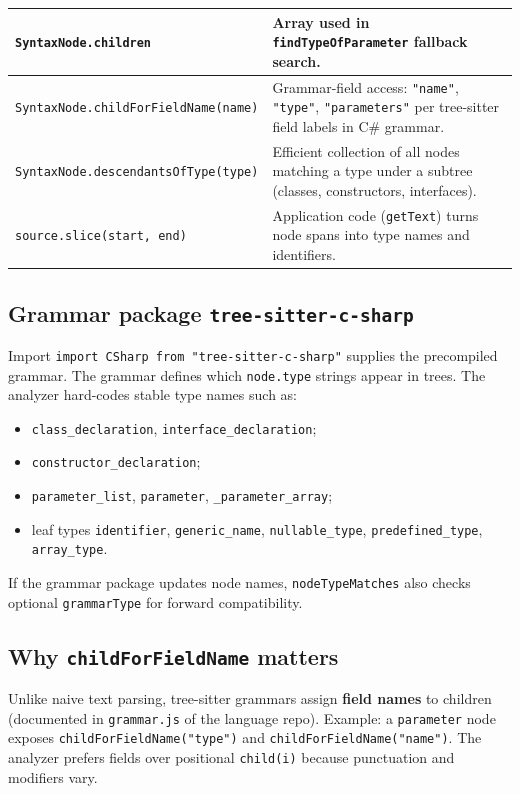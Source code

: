 \begin{table}[htbp]
\begin{tabular}{|p{3.6cm}|p{9.8cm}|}
\hline
\texttt{SyntaxNode.children} & Array used in \texttt{findTypeOfParameter} fallback search. \\
\hline
\texttt{SyntaxNode.childForFieldName(name)} & Grammar-field access: \texttt{"name"}, \texttt{"type"}, \texttt{"parameters"} per tree-sitter field labels in C\# grammar. \\
\hline
\texttt{SyntaxNode.descendantsOfType(type)} & Efficient collection of all nodes matching a type under a subtree (classes, constructors, interfaces). \\
\hline
\texttt{source.slice(start, end)} & Application code (\texttt{getText}) turns node spans into type names and identifiers. \\
\hline
\end{tabular}
\end{table}

\subsection{Grammar package \texttt{tree-sitter-c-sharp}}

Import \texttt{import CSharp from "tree-sitter-c-sharp"} supplies the precompiled grammar. The grammar defines which \texttt{node.type} strings appear in trees. The analyzer hard-codes stable type names such as:
\begin{itemize}
	\item \texttt{class\_declaration}, \texttt{interface\_declaration};
	\item \texttt{constructor\_declaration};
	\item \texttt{parameter\_list}, \texttt{parameter}, \texttt{\_parameter\_array};
	\item leaf types \texttt{identifier}, \texttt{generic\_name}, \texttt{nullable\_type}, \texttt{predefined\_type}, \texttt{array\_type}.
\end{itemize}

If the grammar package updates node names, \texttt{nodeTypeMatches} also checks optional \texttt{grammarType} for forward compatibility.

\subsection{Why \texttt{childForFieldName} matters}

Unlike naive text parsing, tree-sitter grammars assign \textbf{field names} to children (documented in \texttt{grammar.js} of the language repo). Example: a \texttt{parameter} node exposes \texttt{childForFieldName("type")} and \texttt{childForFieldName("name")}. The analyzer prefers fields over positional \texttt{child(i)} because punctuation and modifiers vary.

